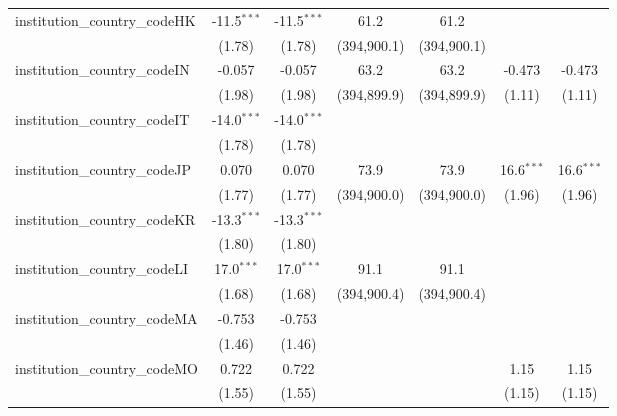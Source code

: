\begin{tabular}{lcccccc}
   institution\_country\_codeHK          & -11.5$^{***}$ & -11.5$^{***}$ & 61.2          & 61.2          &               &   \\   
                                         & (1.78)        & (1.78)        & (394,900.1)   & (394,900.1)   &               &   \\   
   institution\_country\_codeIN          & -0.057        & -0.057        & 63.2          & 63.2          & -0.473        & -0.473\\   
                                         & (1.98)        & (1.98)        & (394,899.9)   & (394,899.9)   & (1.11)        & (1.11)\\   
   institution\_country\_codeIT          & -14.0$^{***}$ & -14.0$^{***}$ &               &               &               &   \\   
                                         & (1.78)        & (1.78)        &               &               &               &   \\   
   institution\_country\_codeJP          & 0.070         & 0.070         & 73.9          & 73.9          & 16.6$^{***}$  & 16.6$^{***}$\\   
                                         & (1.77)        & (1.77)        & (394,900.0)   & (394,900.0)   & (1.96)        & (1.96)\\   
   institution\_country\_codeKR          & -13.3$^{***}$ & -13.3$^{***}$ &               &               &               &   \\   
                                         & (1.80)        & (1.80)        &               &               &               &   \\   
   institution\_country\_codeLI          & 17.0$^{***}$  & 17.0$^{***}$  & 91.1          & 91.1          &               &   \\   
                                         & (1.68)        & (1.68)        & (394,900.4)   & (394,900.4)   &               &   \\   
   institution\_country\_codeMA          & -0.753        & -0.753        &               &               &               &   \\   
                                         & (1.46)        & (1.46)        &               &               &               &   \\   
   institution\_country\_codeMO          & 0.722         & 0.722         &               &               & 1.15          & 1.15\\   
                                         & (1.55)        & (1.55)        &               &               & (1.15)        & (1.15)\\   

\end{tabular}

